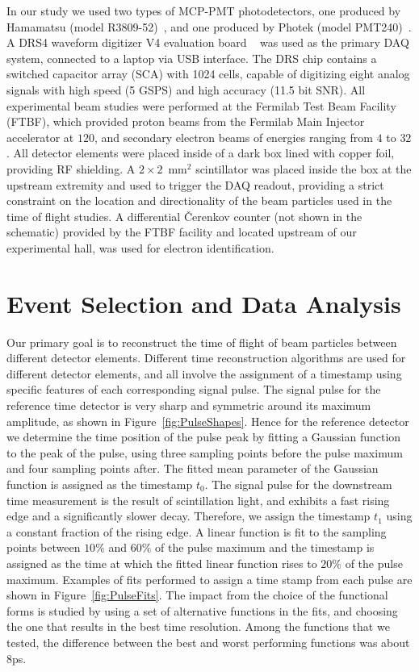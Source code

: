 In our study we used two types of MCP-PMT photodetectors, one produced by Hamamatsu 
(model R3809-52)~\cite{HamamatsuMCP3809}, and one produced by Photek (model
PMT240)~\cite{Photek240}. A DRS4  waveform digitizer V4 evaluation
board ~\cite{DRS4} was used as the primary DAQ system, connected to a laptop via
USB interface.  The DRS chip contains a switched capacitor array (SCA) with 1024 cells, 
capable of digitizing eight analog signals with high speed (5 GSPS) and high 
accuracy (11.5 bit SNR). All experimental beam studies were performed at the Fermilab Test
Beam Facility (FTBF), which provided proton beams from the Fermilab Main
Injector accelerator at $120$\GeV, and secondary electron beams of energies
ranging from $4$ to $32$\GeV. All detector elements were placed inside of a dark box
lined with copper foil, providing RF shielding. A $2\times2$~$\mathrm{mm}^{2}$
scintillator was placed inside the box at the upstream extremity and used to
trigger the DAQ readout, providing a strict constraint on the
location and directionality of the beam particles used in the time of flight
studies. A differential \v{C}erenkov counter (not shown in the schematic) provided by the FTBF
facility and located upstream of our experimental hall, was used for electron
identification. 

\section{Event Selection and Data Analysis}

Our primary goal is to reconstruct the time of flight of beam particles between
different detector elements. Different time reconstruction algorithms are used
for different detector elements, and all involve the assignment of a timestamp
using specific features of each corresponding signal pulse. The signal pulse for
the reference time detector is very sharp and symmetric around its maximum
amplitude, as shown in Figure~\ref{fig:PulseShapes}. Hence for the reference
detector we determine the time position of the pulse peak by fitting a
Gaussian function to the peak of the pulse, using three sampling points before the pulse
maximum and four sampling points after. The fitted mean parameter of the
Gaussian function is assigned as the timestamp $t_{0}$. The signal pulse for the
downstream time measurement is the result of scintillation light, and exhibits a
fast rising edge and a significantly slower decay. Therefore, we assign the
timestamp $t_{1}$ using a constant fraction of the rising edge. A linear
function is fit to the sampling points between $10\%$ and $60\%$ of the pulse
maximum and the timestamp is assigned as the time at which the fitted linear
function rises to $20\%$ of the pulse maximum. Examples of fits performed to
assign a time stamp from each pulse are shown in Figure~\ref{fig:PulseFits}. The
impact from the choice of the functional forms is studied by using a set of
alternative functions in the fits, and choosing the one that results in the best
time resolution. Among the functions that we tested, the difference between the
best and worst performing functions was about 8\unit{ps}.


